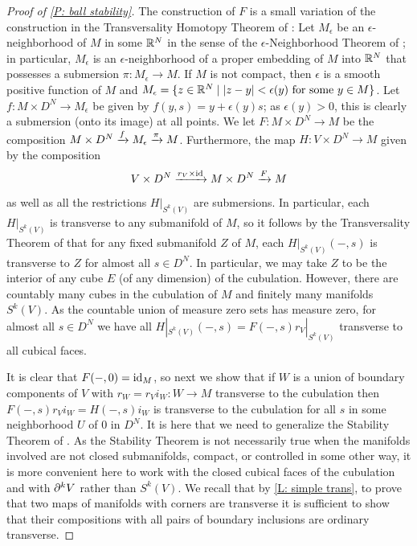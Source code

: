 \begin{proof}[Proof of \cref{P: ball stability}]
The construction of $F$ is a small variation of the construction in the Transversality Homotopy Theorem of \cite[Section 2.3]{GuPo74}:
Let $M_\epsilon$ be an $\epsilon$-neighborhood of $M$ in some $\mathbb{R}^N$ in the sense of the $\epsilon$-Neighborhood Theorem of \cite[Section 2.3]{GuPo74}; in particular,
$M_\epsilon$ is an $\epsilon$-neighborhood of a proper embedding of $M$ into $\mathbb{R}^N$ that possesses a submersion $\pi: M_\epsilon\to M$. If $M$ is not compact, then $\epsilon$ is a smooth positive function of $M$ and $M_\epsilon=\{z\in \mathbb{R}^N\mid |z-y|<\epsilon(y) \text{ for some }y\in M\}$. Let $f: M\times D^N\to M_\epsilon$ be given by $f(y, s)=y + \epsilon(y) s$; as $\epsilon(y)>0$, this is clearly a submersion (onto its image) at all points.
We let $F:M\times D^N\to M$ be the composition $M\times D^N\xrightarrow{f}M_\epsilon \xrightarrow{\pi}M$.
Furthermore, the map $H:V\times D^N\to M$ given by the composition $$V\times D^N\xrightarrow{r_V\times \mathrm{id}} M\times D^N\xrightarrow{F} M$$ as well as all the restrictions $H|_{S^k(V)}$
are submersions.
In particular, each $H|_{S^k(V)}$ is transverse to any submanifold of $M$, so it follows by the Transversality Theorem of \cite[Section 2.3]{GuPo74} that for any fixed submanifold $Z$ of $M$, each $H|_{S^k(V)}(-,s)$ is transverse to $Z$ for almost all $s\in D^N$. In particular, we may take $Z$ to be the interior of any cube $E$ (of any dimension) of the cubulation. However, there are countably many cubes in the cubulation of $M$ and finitely many manifolds $S^k(V)$. As the countable union of measure zero sets has measure zero, for almost all $s\in D^N$ we have all $H|_{S^k(V)}(-,s)=F(-,s)r_V|_{S^k(V)}$  transverse to all cubical faces.

It is clear that $F(-,0)=\mathrm{id}_M$, so next we show that if $W$ is a union of boundary components of $V$ with $r_W=r_Vi_W:W\to M$ transverse to the cubulation  then $F(-,s)r_Vi_W= H(-,s)i_W$ is transverse to the cubulation for all $s$ in some neighborhood $U$ of $0$ in $D^N$. It is here that we need to generalize the Stability Theorem of \cite[Section 1.6]{GuPo74}. As the Stability Theorem is not necessarily true when the manifolds involved are not closed submanifolds, compact, or controlled in some other way, it is more convenient here to work with the closed cubical faces of the cubulation and with $\partial^kV$ rather than $S^k(V)$. We recall that by \cref{L: simple trans}, to prove that two maps of manifolds with corners are transverse it is sufficient to show that their compositions with all pairs of boundary inclusions are ordinary transverse.



\end{proof}
